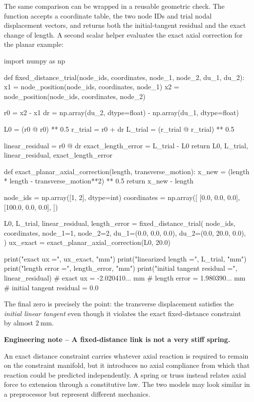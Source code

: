 The same comparison can be wrapped in a reusable geometric check. The function
accepts a coordinate table, the two node IDs and trial nodal displacement
vectors, and returns both the initial-tangent residual and the exact change of
length. A second scalar helper evaluates the exact axial correction for the
planar example:

\begin{python}
import numpy as np


def fixed_distance_trial(node_ids, coordinates, node_1, node_2,
                         du_1, du_2):
    x1 = node_position(node_ids, coordinates, node_1)
    x2 = node_position(node_ids, coordinates, node_2)

    r0 = x2 - x1
    dr = np.array(du_2, dtype=float) - np.array(du_1, dtype=float)

    L0 = (r0 @ r0) ** 0.5
    r_trial = r0 + dr
    L_trial = (r_trial @ r_trial) ** 0.5

    linear_residual = r0 @ dr
    exact_length_error = L_trial - L0
    return L0, L_trial, linear_residual, exact_length_error


def exact_planar_axial_correction(length, transverse_motion):
    x_new = (length * length - transverse_motion**2) ** 0.5
    return x_new - length


node_ids = np.array([1, 2], dtype=int)
coordinates = np.array([
    [0.0,   0.0, 0.0],
    [100.0, 0.0, 0.0],
])

L0, L_trial, linear_residual, length_error = fixed_distance_trial(
    node_ids, coordinates,
    node_1=1,
    node_2=2,
    du_1=(0.0, 0.0, 0.0),
    du_2=(0.0, 20.0, 0.0),
)
ux_exact = exact_planar_axial_correction(L0, 20.0)

print("exact ux =", ux_exact, "mm")
print("linearized length =", L_trial, "mm")
print("length error =", length_error, "mm")
print("initial tangent residual =", linear_residual)
# exact ux = -2.020410... mm
# length error = 1.980390... mm
# initial tangent residual = 0.0
\end{python}

The final zero is precisely the point: the transverse displacement satisfies the
\emph{initial linear tangent} even though it violates the exact fixed-distance
constraint by almost $2~\mathrm{mm}$.

\begin{bbox}
\textbf{Engineering note -- A fixed-distance link is not a very stiff spring.}

An exact distance constraint carries whatever axial reaction is required to
remain on the constraint manifold, but it introduces no axial compliance from
which that reaction could be predicted independently. A spring or truss instead
relates axial force to extension through a constitutive law. The two models may
look similar in a preprocessor but represent different mechanics.
\end{bbox}


